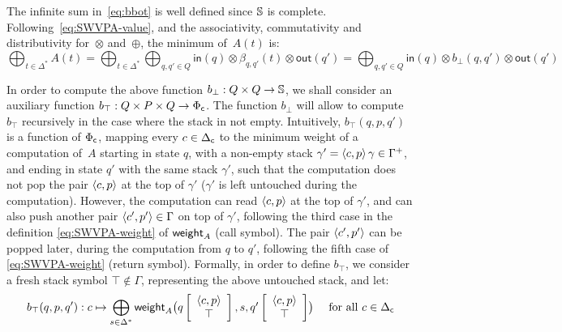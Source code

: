 The infinite sum in~\eqref{eq:bbot} is well defined since $\mathbb{S}$ is complete.
%
Following~\eqref{eq:SWVPA-value}, and the associativity, commutativity
and distributivity for~$\otimes$ and~$\oplus$, the minimum of~$A(t)$ is:
\begin{equation}\label{eq:min}
{\displaystyle\bigoplus_{t\in \Delta^*}} A(t)
=
{\displaystyle\bigoplus_{t\in \Delta^*}}
{\displaystyle\bigoplus_{q, q' \in Q}} \textstyle
\mathsf{in}(q) \mathop{\otimes}
\beta_{q, q'}(t)
\mathop{\otimes} \mathsf{out}(q')
=
{\displaystyle\bigoplus_{q, q' \in Q}} \textstyle
\mathsf{in}(q) \mathop{\otimes}
b_\bot(q, q')
\mathop{\otimes} \mathsf{out}(q')
\end{equation}

\noindent
In order to compute the above function $b_\bot : Q \times Q \to \mathbb{S}$,
we shall consider an auxiliary function $b_\top :  Q \times P \times Q \to {\Phi_\mathsf{c}}$.
The function $b_\bot$ will allow to compute $b_\top$ recursively in the case where the stack in not empty.
%
Intuitively, $b_\top(q, p, q')$ is a function of ${\Phi_\mathsf{c}}$,
mapping every $c \in {\Delta_\mathsf{c}}$ to
the minimum weight of a computation of~$A$
starting in state $q$, 
with a non-empty stack $\gamma' = \<c, p> \, \gamma \in \Gamma^+$,
and ending in state $q'$ with the same stack $\gamma'$,
such that
the computation does not pop the pair $\<c, p>$ at the top of $\gamma'$
(\ie $\gamma'$ is left untouched during the computation).
However, the computation can read $\<c, p>$ at the top of $\gamma'$,
and can also push another pair $\< c', p'> \in \Gamma$ on top of $\gamma'$,
following the third case 
in the definition \eqref{eq:SWVPA-weight} of $\mathsf{weight}_A$ (call symbol).
The pair $\< c', p'>$ can be popped later, during the computation from $q$ to $q'$,
following the fifth case of \eqref{eq:SWVPA-weight} (return symbol).
%
%
Formally, in order to define $b_\top$, we consider
a fresh stack symbol $\top \notin \Gamma$,   %
representing the above untouched stack, and let:
%
\begin{equation}\label{eq:btop}
  b_\top(q, p, q') : c \mapsto \bigoplus_{s\in \Delta^*}
  \textstyle
  \weight_A\bigl(\configup{q}{\< c, p> \stackup \top }, s, \configup{q'}{\<c, p> \stackup \top}\bigr)
\quad
\mathrm{~for~all~} c \in \Deltac
\end{equation}
